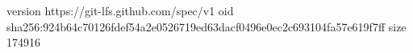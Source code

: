 version https://git-lfs.github.com/spec/v1
oid sha256:924b64c70126fdef54a2e0526719ed63dacf0496e0ec2c693104fa57e619f7ff
size 174916
